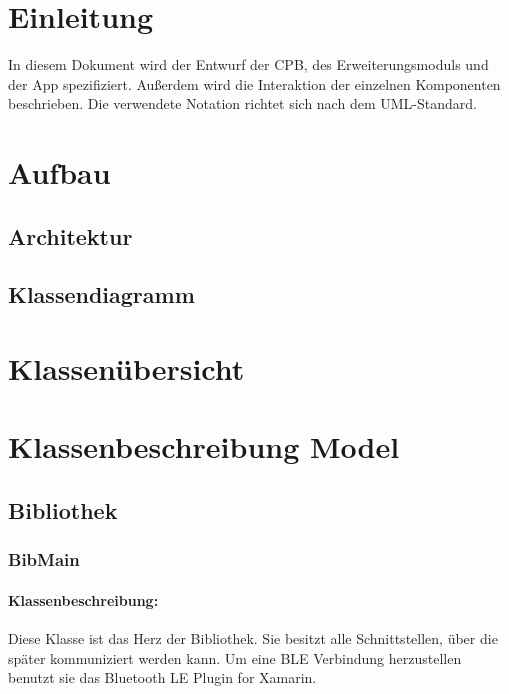 \documentclass[a4paper,12pt]{article}
\title{\projektName}
\date{\today}
\author{Tec O'Brain}
\begin{document}
 \setcounter{page}{2}
 \tableofcontents          %
 \clearpage

\section{Einleitung}
In diesem Dokument wird der Entwurf der \Gls{CPB}, des Erweiterungsmoduls und der App spezifiziert. Außerdem wird die Interaktion der einzelnen Komponenten beschrieben.
Die verwendete Notation richtet sich nach dem UML-Standard.

\section{Aufbau}
    \subsection{Architektur}
    \subsection{Klassendiagramm}


\section{Klassenübersicht}
\section{Klassenbeschreibung Model}
\subsection{Bibliothek}
\subsubsection{BibMain}

\paragraph{Klassenbeschreibung:}
Diese Klasse ist das Herz der Bibliothek. Sie besitzt alle Schnittstellen, über die später kommuniziert werden kann. Um eine BLE Verbindung herzustellen benutzt sie das Bluetooth LE Plugin for Xamarin.
\end{document}
